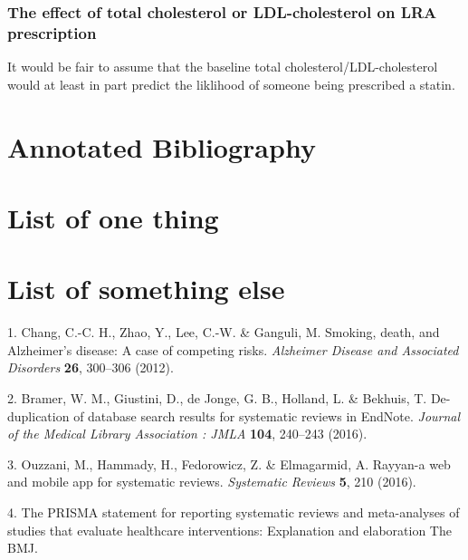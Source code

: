 \documentclass[a4paper, nobind]{templates/ociamthesis}
\begin{document}
\hypertarget{the-effect-of-total-cholesterol-or-ldl-cholesterol-on-lra-prescription}{%
\subsection{The effect of total cholesterol or LDL-cholesterol on LRA prescription}\label{the-effect-of-total-cholesterol-or-ldl-cholesterol-on-lra-prescription}}

It would be fair to assume that the baseline total cholesterol/LDL-cholesterol would at least in part predict the liklihood of someone being prescribed a statin.

\hypertarget{annotated-bibliography}{%
\chapter{Annotated Bibliography}\label{annotated-bibliography}}

\startappendices

\hypertarget{list-of-one-thing}{%
\chapter{List of one thing}\label{list-of-one-thing}}

\hypertarget{list-of-something-else}{%
\chapter{List of something else}\label{list-of-something-else}}

\hypertarget{refs}{}
\leavevmode\hypertarget{ref-chang2012}{}%
1. Chang, C.-C. H., Zhao, Y., Lee, C.-W. \& Ganguli, M. Smoking, death, and Alzheimer's disease: A case of competing risks. \emph{Alzheimer Disease and Associated Disorders} \textbf{26}, 300--306 (2012).

\leavevmode\hypertarget{ref-bramer2016}{}%
2. Bramer, W. M., Giustini, D., de Jonge, G. B., Holland, L. \& Bekhuis, T. De-duplication of database search results for systematic reviews in EndNote. \emph{Journal of the Medical Library Association : JMLA} \textbf{104}, 240--243 (2016).

\leavevmode\hypertarget{ref-ouzzani2016}{}%
3. Ouzzani, M., Hammady, H., Fedorowicz, Z. \& Elmagarmid, A. Rayyan-a web and mobile app for systematic reviews. \emph{Systematic Reviews} \textbf{5}, 210 (2016).

\leavevmode\hypertarget{ref-zotero-766}{}%
4. The PRISMA statement for reporting systematic reviews and meta-analyses of studies that evaluate healthcare interventions: Explanation and elaboration \textbar{} The BMJ.
\end{document}
